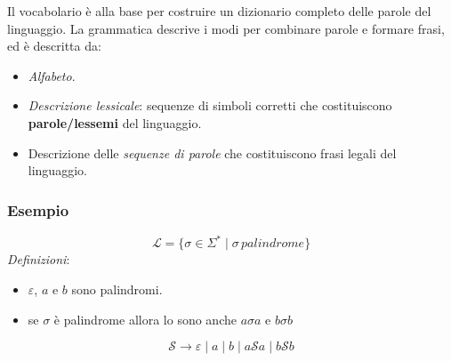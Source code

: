 \documentclass[oneside,a4paper,11pt]{book}
\theoremstyle{italicstyle}
\theoremstyle{normStyle}
\begin{document}
Il vocabolario è alla base per costruire un dizionario completo 
delle parole del linguaggio. La grammatica descrive i modi per 
combinare parole e formare frasi, ed è descritta da:
\begin{itemize}
  \item \textit{Alfabeto}.
  \item \textit{Descrizione lessicale}: sequenze di simboli 
  corretti che costituiscono \textbf{parole/lessemi} del linguaggio.
  \item Descrizione delle \textit{sequenze di parole} che costituiscono 
  frasi legali del linguaggio.
\end{itemize}
\subsubsection{Esempio}
\[
\mathcal{L}= \{\sigma \in \Sigma^* \mid \sigma\,palindrome\}
\]
\textit{Definizioni}: 
\begin{itemize}
  \item $\varepsilon$, $a$ e $b$ sono palindromi.
  \item se $\sigma$ è palindrome allora lo sono anche $a\sigma a$ e $b\sigma b$
\end{itemize}
\[
\mathcal{S} \longrightarrow \varepsilon \mid a \mid b \mid a\mathcal{S} a \mid b\mathcal{S} b
\]
\end{document}
